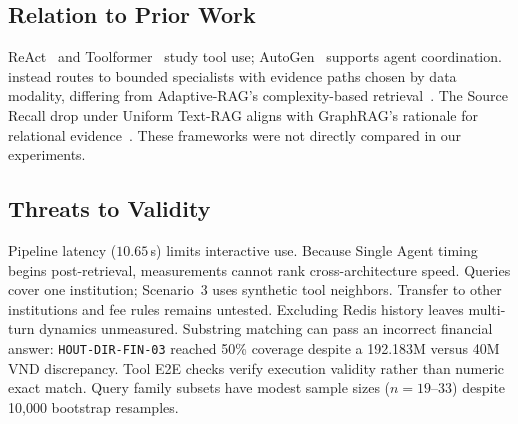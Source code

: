\subsection{Relation to Prior Work}

ReAct~\cite{yao2023react} and Toolformer~\cite{schick2023toolformer} study tool use; AutoGen~\cite{wu2023autogen} supports agent coordination. \system{} instead routes to bounded specialists with evidence paths chosen by data modality, differing from Adaptive-RAG's complexity-based retrieval~\cite{jeong2024adaptiverag}. The Source Recall drop under Uniform Text-RAG aligns with GraphRAG's rationale for relational evidence~\cite{edge2024graphrag}. These frameworks were not directly compared in our experiments.

\subsection{Threats to Validity}
\label{sec:limitations}
Pipeline latency ($10.65$\,s) limits interactive use. Because Single Agent timing begins post-retrieval, measurements cannot rank cross-architecture speed. Queries cover one institution; Scenario~3 uses synthetic tool neighbors. Transfer to other institutions and fee rules remains untested. Excluding Redis history leaves multi-turn dynamics unmeasured. Substring matching can pass an incorrect financial answer: \texttt{HOUT-DIR-FIN-03} reached 50\% coverage despite a 192.183M versus 40M VND discrepancy. Tool E2E checks verify execution validity rather than numeric exact match. Query family subsets have modest sample sizes ($n=19$--$33$) despite 10,000 bootstrap resamples.
